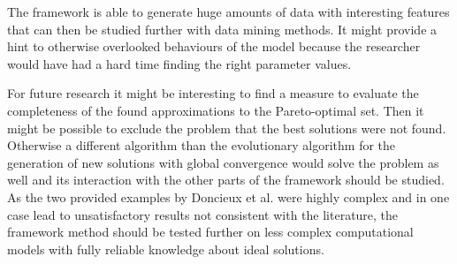 \documentclass[12pt,twoside]{article}
\theoremstyle{plain}
\theoremstyle{definition}
\theoremstyle{remark}
\begin{document}
The framework is able to generate huge amounts of data with interesting features that can then be studied further with data mining methods.
It might provide a hint to otherwise overlooked behaviours of the model because the researcher would have had a hard time finding the right parameter values.\medskip

For future research it might be interesting to find a measure to evaluate the completeness of the found approximations to the Pareto-optimal set.
Then it might be possible to exclude the problem that the best solutions were not found. 
Otherwise a different algorithm than the evolutionary algorithm for the generation of new solutions with global convergence would solve the problem as well and its interaction with the other parts of the framework should be studied.\\
As the two provided examples by Doncieux et al. were highly complex and in one case lead to unsatisfactory results not consistent with the literature, the framework method should be tested further on less complex computational models with fully reliable knowledge about ideal solutions.

%
%
\newpage


\end{document}
